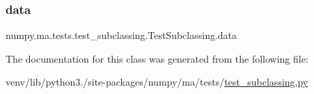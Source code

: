 \subsubsection{\texorpdfstring{data}{data}}
{\footnotesize\ttfamily numpy.\+ma.\+tests.\+test\+\_\+subclassing.\+Test\+Subclassing.\+data}



The documentation for this class was generated from the following file\+:\begin{DoxyCompactItemize}
\item 
venv/lib/python3./site-\/packages/numpy/ma/tests/\hyperlink{test__subclassing_8py}{test\+\_\+subclassing.\+py}\end{DoxyCompactItemize}
